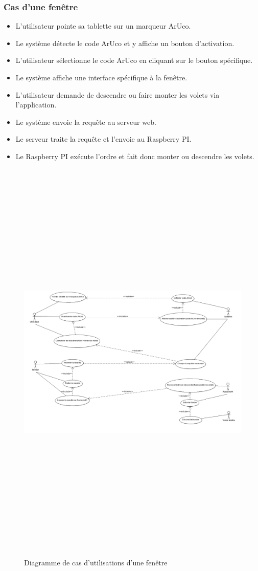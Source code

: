 \documentclass[12pt,a4paper]{article}
\begin{document}
\subsubsection{Cas d'une fenêtre}
\begin{itemize} 
  \item L'utilisateur pointe sa tablette sur un marqueur ArUco.
  \item Le système détecte le code ArUco et y affiche un bouton d'activation. 
  \item L'utilisateur sélectionne le code ArUco en cliquant sur le bouton spécifique.
  \item Le système affiche une interface spécifique à la fenêtre.
  \item L'utilisateur demande de descendre ou faire monter les volets via l'application.
  \item Le système envoie la requête au serveur web.
  \item Le serveur traite la requête et l'envoie au Raspberry PI.
  \item Le Raspberry PI exécute l'ordre et fait donc monter ou descendre les volets.
\end{itemize}
\newpage
\begin{figure}[h!]
  \centering
  \includegraphics[width = 15cm,height=20cm]{DCU_Fenetre.png}
  \caption{Diagramme de cas d'utilisations d'une fenêtre}
\end{figure}
\newpage
\end{document}
